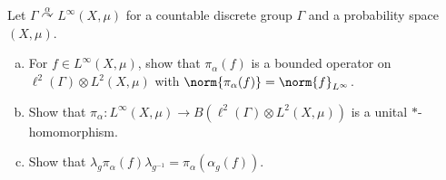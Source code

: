\documentclass[10pt]{mypackage}
\begin{document}
\RaggedRight
\begin{problem}[Problem 1]
  Let $\Gamma\overset{\alpha}{\curvearrowright}L^{\infty}\left( X,\mu \right)$ for a countable discrete group $\Gamma$ and a probability space $\left( X,\mu \right)$.
  \begin{enumerate}[(a)]
    \item For $f\in L^{\infty}\left( X,\mu \right)$, show that $\pi_{\alpha}(f)$ is a bounded operator on $\ell^2\left( \Gamma \right)\otimes L^{2}\left( X,\mu \right)$ with $\norm{\pi_{\alpha}(f)} = \norm{f}_{L^{\infty}}$.
    \item Show that $\pi_{\alpha}\colon L^{\infty}\left( X,\mu \right)\rightarrow B\left( \ell^2\left( \Gamma \right) \otimes L^2\left( X,\mu \right)\right)$ is a unital $\ast$-homomorphism.
    \item Show that $\lambda_g\pi_{\alpha}(f)\lambda_{g^{-1}} = \pi_{\alpha}\left( \alpha_g(f) \right)$.
  \end{enumerate}
\end{problem}
\end{document}
